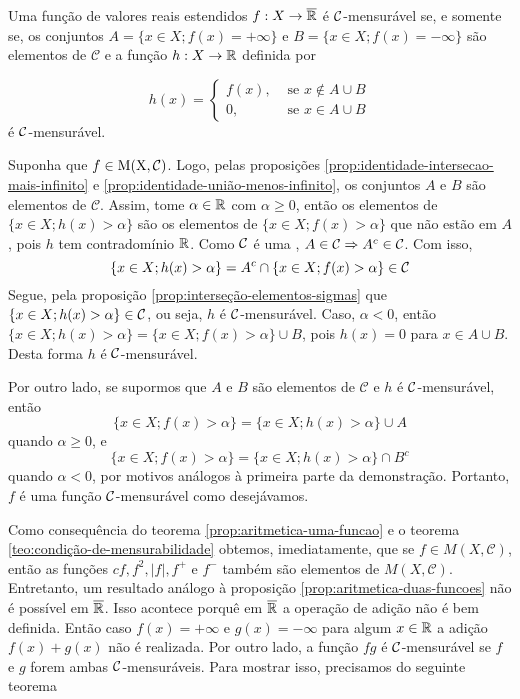     \begin{theorem}
    \label{teo:condição-de-mensurabilidade}
        Uma função de valores reais estendidos $f: X \to \operatorname{\overline{\mathbb{R}}}$ é $\operatorname{\mathcal{C}}$-mensurável se, e somente se, os conjuntos 
        $A = \{ x \in X; f(x) = +\infty\}$ e $B = \{x \in X; f(x) = -\infty\}$
		 são elementos de $\mathcal{C}$ e a função $h: X \to \mathbb{R}$ definida por
		 
		 $$
		 h(x) = \left\{\begin{array}{cc}
		     f(x), & \textrm{\ se } x \notin A\cup B  \\
		      0,& \textrm{\ se } x \in A\cup B
		 \end{array}\right.
		 $$
		 é $\operatorname{\mathcal{C}}$-mensurável.
	 \end{theorem}
\begin{prova}
    Suponha que $f \in \operatorname{M(X, \mathcal{C} )}$. 
    Logo, pelas proposições \ref{prop:identidade-intersecao-mais-infinito} e \ref{prop:identidade-união-menos-infinito}, os conjuntos $A$ e $B$ são elementos de $\mathcal{C}$.
    Assim, tome $\alpha \in \mathbb{R}$ com $\alpha \geq 0$, então os elementos de $\{x \in X; h(x) > \alpha\}$ são os elementos de $\{x \in X; f(x) > \alpha\}$ que não estão em $A$, pois $h$ tem contradomínio $\mathbb{R}$.
    Como $\operatorname{\mathcal{C}}$ é uma \sigal\hspace{-0.1cm}, $A \in \operatorname{\mathcal{C}} \Rightarrow A^c \in \operatorname{\mathcal{C}}$. 
    Com isso, 
    $$
    \{x \in X; h(x) > \alpha\} = A^c\cap \{x \in X; f(x) > \alpha\} \in \operatorname{\mathcal{C}}
    $$
    Segue, pela proposição \ref{prop:interseção-elementos-sigmas} que $\{x \in X; h(x) > \alpha\} \in \operatorname{\mathcal{C}}$, ou seja, $h$ é $\operatorname{\mathcal{C}}$-mensurável.
    Caso, $\alpha < 0$, então $\{x \in X; h(x) > \alpha\} = \{x \in  X ; f(x) > \alpha\} \cup B $, pois $h(x) = 0$ para $x \in A \cup B$.
    Desta forma $h$ é $\operatorname{\mathcal{C}}$-mensurável.

    Por outro lado, se supormos que $A$ e $B$ são elementos de $\mathcal{C}$ e $h$ é $\operatorname{\mathcal{C}}$-mensurável, então
    $$\{x \in X; f(x) > \alpha\} = \{x \in  X ; h(x) > \alpha\} \cup A $$
    quando $\alpha \geq 0$, e 
    $$\{x \in X; f(x) > \alpha\} = \{x \in  X ; h(x) > \alpha\} \cap B^c $$
    quando  $\alpha < 0$, por motivos análogos à primeira parte da demonstração.
    Portanto, $f$ é uma função $\operatorname{\mathcal{C}}$-mensurável como desejávamos.
\end{prova}

Como consequência do teorema \ref{prop:aritmetica-uma-funcao} e o teorema \ref{teo:condição-de-mensurabilidade} obtemos, imediatamente, que se $ f \in M(X,\mathcal{C})$, então as funções $cf, f^2, |f|, f^+$ e $f^-$ também são elementos de $M(X, \mathcal{C})$.
Entretanto, um resultado análogo à proposição \ref{prop:aritmetica-duas-funcoes} não é possível em $\operatorname{\overline{\mathbb{R}}}$.
Isso acontece porquê em $\operatorname{\overline{\mathbb{R}}}$ a operação de adição não é bem definida.
Então caso $f(x) = +\infty$ e $g(x) = -\infty$ para algum $x \in \mathbb{R}$ a adição
$f(x) + g(x)$ não é realizada.
Por outro lado, a função $fg$ é $\operatorname{\mathcal{C}}$-mensurável se $f$ e $g$ forem ambas $\operatorname{\mathcal{C}}$-mensuráveis.
Para mostrar isso, precisamos do seguinte teorema

